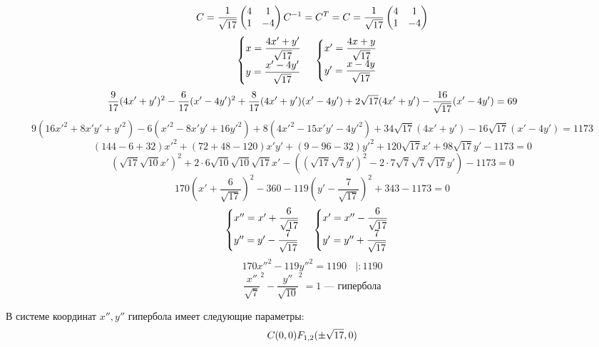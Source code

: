 \documentclass[12pt]{article}
\begin{document}
\[
    C = \dfrac{1}{\sqrt{17}}\begin{pmatrix}
        4 & 1  \\
        1 & -4 \\
    \end{pmatrix} \\
    C^{-1} = C^T = C = \dfrac{1}{\sqrt{17}} \begin{pmatrix}
        4 & 1  \\
        1 & -4 \\
    \end{pmatrix}
\]
\[
    \begin{cases}
        x = \dfrac{4x' + y'}{\sqrt{17}} \\
        y = \dfrac{x' - 4y'}{\sqrt{17}}
    \end{cases}
    \\
    \begin{cases}
        x' = \dfrac{4x + y}{\sqrt{17}} \\
        y' = \dfrac{x - 4y}{\sqrt{17}}
    \end{cases}
\]
\[
    \dfrac{9}{17}(4x' + y')^2 - \dfrac{6}{17}(x' - 4y')^2 + \dfrac{8}{17}(4x' + y')(x' - 4y') + 2\sqrt{17} (4x' + y') - \dfrac{16}{\sqrt{17}}(x' - 4y') = 69 \\
\]
\[
    9(16{x'}^2 + 8x'y' + {y'}^2) - 6({x'}^2 - 8x'y' + 16{y'}^2) + 8(4{x'}^2 - 15x'y' - 4{y'}^2) + 34\sqrt{17}(4x' + y') - 16\sqrt{17}(x' - 4y') = 1173
\]
\[
    (144 - 6 + 32){x'}^2 + (72 + 48 - 120)x'y' + (9 - 96 - 32){y'}^2 + 120\sqrt{17}x' + 98\sqrt{17}y' - 1173 = 0
\]
\[
    (\sqrt{17}\sqrt{10}{x'})^2 + 2 \cdot 6 \sqrt{10} \sqrt{10} \sqrt{17}x' - ((\sqrt{17}\sqrt{7}{y'})^2 - 2 \cdot 7 \sqrt{7} \sqrt{7} \sqrt{17}y') - 1173 = 0
\]
\[
    170({x'} + \dfrac{6}{\sqrt{17}})^2 - 360 - 119({y'} - \dfrac{7}{\sqrt{17}})^2 + 343 - 1173 = 0
\]
\[
    \begin{cases}
        x'' = x' + \dfrac{6}{\sqrt{17}} \\
        y'' = y' - \dfrac{7}{\sqrt{17}}
    \end{cases}
    \\
    \begin{cases}
        x' = x'' - \dfrac{6}{\sqrt{17}} \\
        y' = y'' + \dfrac{7}{\sqrt{17}}
    \end{cases}
\]
\[
    170{x''}^2 - 119{y''}^2 = 1190 \ \ \ \ | : 1190
\]
\[
    \dfrac{x''}{\sqrt{7}}^2 - \dfrac{y''}{\sqrt{10}}^2 = 1 \text{ — гипербола}
\]

В системе координат $x'', y''$ гипербола имеет следующие параметры:
\[
    C(0, 0) \\ F_{1,2}(\pm\sqrt{17}, 0)
\]
\end{document}
